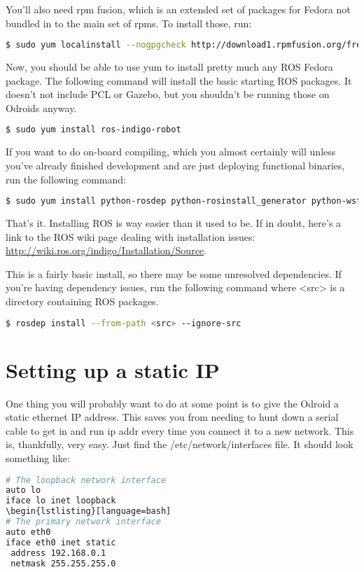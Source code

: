 You'll also need rpm fusion, which is an extended set of packages for Fedora not bundled in to the main set of rpms. To install those, run:

\begin{lstlisting}[language=bash]
  $ sudo yum localinstall --nogpgcheck http://download1.rpmfusion.org/free/fedora/rpmfusion-free-release-$(rpm  -E %fedora).noarch.rpm http://download1.rpmfusion.org/nonfree/fedora/rpmfusion-nonfree-release-$(rpm -E %fedora).noarch.rpm	
\end{lstlisting}

Now, you should be able to use yum to install pretty much any ROS Fedora package. The following command will install the basic starting ROS packages. It doesn't not include PCL or Gazebo, but you shouldn't be running those on Odroids anyway.

\begin{lstlisting}[language=bash]
  $ sudo yum install ros-indigo-robot	
\end{lstlisting}

If you want to do on-board compiling, which you almost certainly will unless you've already finished development and are just deploying functional binaries, run the following command:

\begin{lstlisting}[language=bash]
  $ sudo yum install python-rosdep python-rosinstall_generator python-wstool python-rosinstall @buildsys-build	
\end{lstlisting}

That's it. Installing ROS is way easier than it used to be. If in doubt, here's a link to the ROS wiki page dealing with installation issues: \url{http://wiki.ros.org/indigo/Installation/Source}.

This is a fairly basic install, so there may be some unresolved dependencies. If you're having dependency issues, run the following command where <src> is a directory containing ROS packages.

\begin{lstlisting}[language=bash]
  $ rosdep install --from-path <src> --ignore-src	
\end{lstlisting}

\section{Setting up a static IP}

One thing you will probably want to do at some point is to give the Odroid a static ethernet IP address. This saves you from needing to hunt down a serial cable to get in and run ip addr every time you connect it to a new network. This is, thankfully, very easy. Just find the /etc/network/interfaces file. It should look something like:
\begin{lstlisting}[language=bash]
# The loopback network interface
auto lo
iface lo inet loopback
\begin{lstlisting}[language=bash]
# The primary network interface
auto eth0
iface eth0 inet static
 address 192.168.0.1
 netmask 255.255.255.0
\end{lstlisting}

